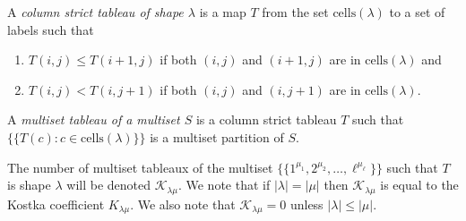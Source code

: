 \documentclass{amsart}
\theoremstyle{definition}
\newcommand{\lcr}{\{\!\!\{}
\newcommand{\rcr}{\}\!\!\}}
\begin{document}
A {\it column strict tableau of shape $\lambda$}
is a map  $T$ from the set ${\mathrm{cells}}(\lambda)$ to a set of labels
such that
\begin{enumerate}
\item $T(i,j) \leqslant T(i+1,j)$ if both $(i,j)$ and $(i+1,j)$ are
in ${\mathrm{cells}}(\lambda)$ and
\item
$T(i,j) < T(i,j+1)$ if both $(i,j)$ and $(i,j+1)$ are
in ${\mathrm{cells}}(\lambda)$.
\end{enumerate}
A {\it multiset tableau of a multiset $S$} is a column strict tableau $T$
such that $\lcr T(c) : c \in {\mathrm{cells}}(\lambda) \rcr$
is a multiset partition of $S$.

The number of multiset tableaux of the multiset
$\lcr 1^{\mu_1}, 2^{\mu_2}, \ldots, \ell^{\mu_\ell} \rcr$
such that $T$ is shape $\lambda$ will be denoted
${\mathcal K}_{\lambda\mu}$.  We note that if $|\lambda| = |\mu|$
then ${\mathcal K}_{\lambda\mu}$ is equal to the Kostka
coefficient $K_{\lambda\mu}$.  We also note that
${\mathcal K}_{\lambda\mu} = 0$ unless $|\lambda|\leq|\mu|$.
\end{document}
